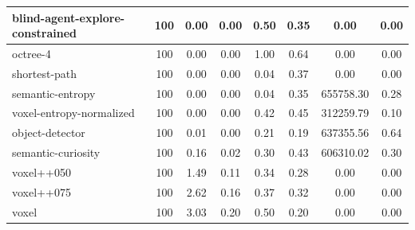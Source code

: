 \begin{table}
\begin{longtable}{|l|c|c| c|c| c|c|c|}
blind-agent-explore-constrained & 100 & {\cellcolor[HTML]{EBF2F0}} \color[HTML]{000000} 0.00 & {\cellcolor[HTML]{EBF2F0}} \color[HTML]{000000} 0.00 & {\cellcolor[HTML]{ACD4CC}} \color[HTML]{000000} 0.50 & 0.35 & 0.00 & 0.00 \\ \hline
octree-4 & 100 & {\cellcolor[HTML]{EBF2F0}} \color[HTML]{000000} 0.00 & {\cellcolor[HTML]{EBF2F0}} \color[HTML]{000000} 0.00 & {\cellcolor[HTML]{55AA99}} \color[HTML]{F1F1F1} 1.00 & 0.64 & 0.00 & 0.00 \\ \hline
shortest-path & 100 & {\cellcolor[HTML]{EBF2F0}} \color[HTML]{000000} 0.00 & {\cellcolor[HTML]{EBF2F0}} \color[HTML]{000000} 0.00 & {\cellcolor[HTML]{EBF2F0}} \color[HTML]{000000} 0.04 & 0.37 & 0.00 & 0.00 \\ \hline
semantic-entropy & 100 & {\cellcolor[HTML]{EBF2F0}} \color[HTML]{000000} 0.00 & {\cellcolor[HTML]{EBF2F0}} \color[HTML]{000000} 0.00 & {\cellcolor[HTML]{EBF2F0}} \color[HTML]{000000} 0.04 & 0.35 & 655758.30 & 0.28 \\ \hline
voxel-entropy-normalized & 100 & {\cellcolor[HTML]{EBF2F0}} \color[HTML]{000000} 0.00 & {\cellcolor[HTML]{EBF2F0}} \color[HTML]{000000} 0.00 & {\cellcolor[HTML]{BADBD4}} \color[HTML]{000000} 0.42 & 0.45 & 312259.79 & 0.10 \\ \hline
object-detector & 100 & {\cellcolor[HTML]{EBF2F0}} \color[HTML]{000000} 0.01 & {\cellcolor[HTML]{EBF2F0}} \color[HTML]{000000} 0.00 & {\cellcolor[HTML]{E0EDEA}} \color[HTML]{000000} 0.21 & 0.19 & 637355.56 & 0.64 \\ \hline
semantic-curiosity & 100 & {\cellcolor[HTML]{EBF2F0}} \color[HTML]{000000} 0.16 & {\cellcolor[HTML]{EBF2F0}} \color[HTML]{000000} 0.02 & {\cellcolor[HTML]{CFE5E0}} \color[HTML]{000000} 0.30 & 0.43 & 606310.02 & 0.30 \\ \hline
voxel++050 & 100 & {\cellcolor[HTML]{D5E8E4}} \color[HTML]{000000} 1.49 & {\cellcolor[HTML]{EBF2F0}} \color[HTML]{000000} 0.11 & {\cellcolor[HTML]{C8E2DC}} \color[HTML]{000000} 0.34 & 0.28 & 0.00 & 0.00 \\ \hline
voxel++075 & 100 & {\cellcolor[HTML]{C3DFD9}} \color[HTML]{000000} 2.62 & {\cellcolor[HTML]{D9EAE6}} \color[HTML]{000000} 0.16 & {\cellcolor[HTML]{C2DFD9}} \color[HTML]{000000} 0.37 & 0.32 & 0.00 & 0.00 \\ \hline
voxel & 100 & {\cellcolor[HTML]{BDDCD5}} \color[HTML]{000000} 3.03 & {\cellcolor[HTML]{BADAD4}} \color[HTML]{000000} 0.20 & {\cellcolor[HTML]{ACD4CC}} \color[HTML]{000000} 0.50 & 0.20 & 0.00 & 0.00 \\ \hline

\end{longtable}
\end{table}
